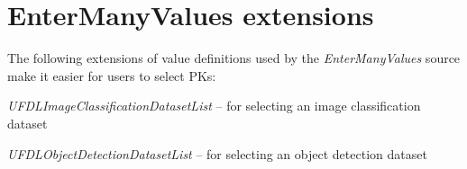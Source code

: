 \documentclass[a4paper]{book}
\begin{document}
\section{EnterManyValues extensions}
The following extensions of value definitions used by the \textit{EnterManyValues}
source make it easier for users to select PKs:
\begin{tight_itemize}
  \item \textit{UFDLImageClassificationDatasetList} -- for selecting an image classification dataset
  \item \textit{UFDLObjectDetectionDatasetList} -- for selecting an object detection dataset
\end{tight_itemize}


\end{document}
